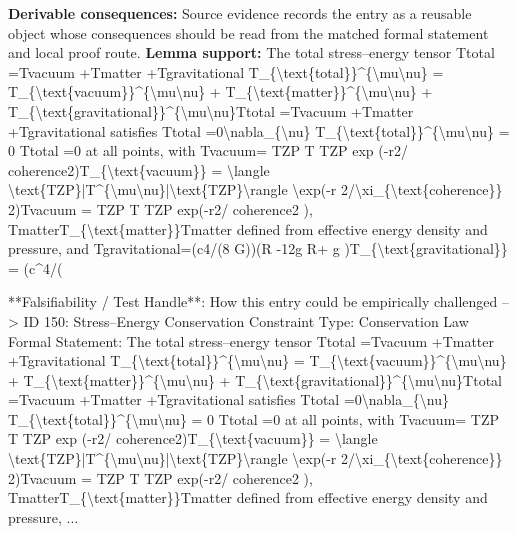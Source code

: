 \textbf{Derivable consequences:} Source evidence records the entry as a reusable object whose consequences should be read from the matched formal statement and local proof route.
\textbf{Lemma support:} The total stress--energy tensor Ttotal  =Tvacuum  +Tmatter  +Tgravitational  T\_\{\textbackslash{}text\{total\}\}\textasciicircum{}\{\textbackslash{}mu\textbackslash{}nu\} = T\_\{\textbackslash{}text\{vacuum\}\}\textasciicircum{}\{\textbackslash{}mu\textbackslash{}nu\} + T\_\{\textbackslash{}text\{matter\}\}\textasciicircum{}\{\textbackslash{}mu\textbackslash{}nu\} + T\_\{\textbackslash{}text\{gravitational\}\}\textasciicircum{}\{\textbackslash{}mu\textbackslash{}nu\}Ttotal   =Tvacuum   +Tmatter   +Tgravitational   satisfies   Ttotal  =0\textbackslash{}nabla\_\{\textbackslash{}nu\} T\_\{\textbackslash{}text\{total\}\}\textasciicircum{}\{\textbackslash{}mu\textbackslash{}nu\} = 0   Ttotal   =0 at all points, with Tvacuum= TZP T   TZP exp (-r2/ coherence2)T\_\{\textbackslash{}text\{vacuum\}\} = \textbackslash{}langle \textbackslash{}text\{TZP\}|T\textasciicircum{}\{\textbackslash{}mu\textbackslash{}nu\}|\textbackslash{}text\{TZP\}\textbackslash{}rangle \textbackslash{}exp(-r 2/\textbackslash{}xi\_\{\textbackslash{}text\{coherence\}\} 2)Tvacuum = TZP T   TZP exp(-r2/ coherence2 ), TmatterT\_\{\textbackslash{}text\{matter\}\}Tmatter defined from effective energy density and pressure, and Tgravitational=(c4/(8 G))(R  -12g  R+ g  )T\_\{\textbackslash{}text\{gravitational\}\} = (c\textasciicircum{}4/(\par
\endgroup

  **Falsifiability / Test Handle**: How this entry could be empirically challenged --> ID 150: Stress--Energy Conservation Constraint Type: Conservation Law Formal Statement: The total stress--energy tensor Ttotal  =Tvacuum  +Tmatter  +Tgravitational  T\_\{\textbackslash{}text\{total\}\}\textasciicircum{}\{\textbackslash{}mu\textbackslash{}nu\} = T\_\{\textbackslash{}text\{vacuum\}\}\textasciicircum{}\{\textbackslash{}mu\textbackslash{}nu\} + T\_\{\textbackslash{}text\{matter\}\}\textasciicircum{}\{\textbackslash{}mu\textbackslash{}nu\} + T\_\{\textbackslash{}text\{gravitational\}\}\textasciicircum{}\{\textbackslash{}mu\textbackslash{}nu\}Ttotal   =Tvacuum   +Tmatter   +Tgravitational   satisfies   Ttotal  =0\textbackslash{}nabla\_\{\textbackslash{}nu\} T\_\{\textbackslash{}text\{total\}\}\textasciicircum{}\{\textbackslash{}mu\textbackslash{}nu\} = 0   Ttotal   =0 at all points, with Tvacuum= TZP T   TZP exp (-r2/ coherence2)T\_\{\textbackslash{}text\{vacuum\}\} = \textbackslash{}langle \textbackslash{}text\{TZP\}|T\textasciicircum{}\{\textbackslash{}mu\textbackslash{}nu\}|\textbackslash{}text\{TZP\}\textbackslash{}rangle \textbackslash{}exp(-r 2/\textbackslash{}xi\_\{\textbackslash{}text\{coherence\}\} 2)Tvacuum = TZP T   TZP exp(-r2/ coherence2 ), TmatterT\_\{\textbackslash{}text\{matter\}\}Tmatter defined from effective energy density and pressure, ...

